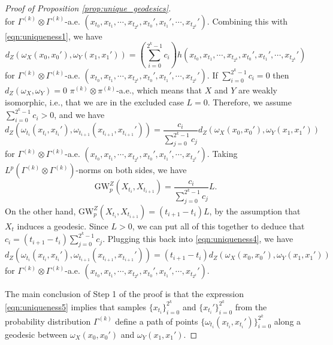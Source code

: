 \documentclass{article}
\theoremstyle{definition}
\newcommand{\dgwz}{\mathrm{GW}_p^Z}
\begin{document}
\begin{proof}[Proof of Proposition \ref{prop:unique_geodesics}]
\begin{equation}
    \end{equation}
%
    for $\Gamma^{(k)} \otimes \Gamma^{(k)}$-a.e. $(x_{t_0}, x_{t_1}, \cdots, x_{t_{2^k}}, x_{t_0}', x_{t_1}', \cdots, x_{t_{2^k}}')$. Combining this with \eqref{eqn:uniqueness1}, we have
    \begin{equation}\label{eqn:uniqueness3}
        d_Z(\omega_X(x_0, x_0'), \omega_Y(x_1, x_1')) = \left(\sum_{i=0}^{2^k - 1} c_i\right) h(x_{t_0}, x_{t_1}, \cdots, x_{t_{2^k}}, x_{t_0}', x_{t_1}', \cdots, x_{t_{2^k}}')
    \end{equation}
    for $\Gamma^{(k)} \otimes \Gamma^{(k)}$-a.e. $(x_{t_0}, x_{t_1}, \cdots, x_{t_{2^k}}, x_{t_0}', x_{t_1}', \cdots, x_{t_{2^k}}')$. If $\sum_{i=0}^{2^k - 1} c_i = 0$ then $d_Z(\omega_X, \omega_Y) = 0$ $\pi^{(k)} \otimes \pi^{(k)}$-a.e., which means that $X$ and $Y$ are weakly isomorphic, i.e., that we are in the excluded case $L = 0$. Therefore, we assume $\sum_{i=0}^{2^k - 1} c_i > 0$, and we have 
    \begin{equation}\label{eqn:uniqueness4}
        d_Z(\omega_{t_{i}}(x_{t_i}, x_{t_i}'), \omega_{t_{i+1}}(x_{t_{i+1}}, x_{t_{i+1}}')) = \frac{c_i}{\sum_{j=0}^{2^k - 1} c_j} d_Z(\omega_X(x_0, x_0'), \omega_Y(x_1, x_1'))
    \end{equation}
    for $\Gamma^{(k)} \otimes \Gamma^{(k)}$-a.e. $(x_{t_0}, x_{t_1}, \cdots, x_{t_{2^k}}, x_{t_0}', x_{t_1}', \cdots, x_{t_{2^k}}')$. Taking \(L^p(\Gamma^{(k)}\otimes\Gamma^{(k)})\)-norms on both sides, we have
    \begin{equation}
        \dgwz(X_{t_{i}}, X_{t_{i+1}}) =  \frac{c_i}{\sum_{j=0}^{2^k - 1} c_j}L.
    \end{equation}
    On the other hand, $\dgwz(X_{t_{i}}, X_{t_{i+1}}) = (t_{i+1} - t_i)L$, by the assumption that $X_t$ induces a geodesic. Since $L > 0$, we can put all of this together to deduce that   $c_i = (t_{i+1} - t_i)\sum_{j=0}^{2^k - 1} c_j$. Plugging this back into \eqref{eqn:uniqueness4}, we have
    \begin{equation}
        \label{eqn:uniqueness5}
        d_Z(\omega_{t_{i}}(x_{t_i}, x_{t_i}'), \omega_{t_{i+1}}(x_{t_{i+1}}, x_{t_{i+1}}')) = (t_{i+1} - t_i) d_Z(\omega_X(x_0, x_0'), \omega_Y(x_1, x_1'))
    \end{equation}
    for $\Gamma^{(k)} \otimes \Gamma^{(k)}$-a.e. $(x_{t_0}, x_{t_1}, \cdots, x_{t_{2^k}}, x_{t_0}', x_{t_1}', \cdots, x_{t_{2^k}}')$. 
    
    The main conclusion of Step 1 of the proof is that the expression \eqref{eqn:uniqueness5} implies that samples $\{x_{t_i}\}_{i=0}^{2^k}$ and $\{x_{t_i}'\}_{i=0}^{2^k}$ from the probability distribution $\Gamma^{(k)}$ define a path of points $\{\omega_{t_i}(x_{t_i}, x_{t_i}')\}_{i=0}^{2^k}$ along a geodesic between $\omega_X(x_0, x_0')$ and $\omega_Y(x_1, x_1')$.


\end{proof}
\end{document}
